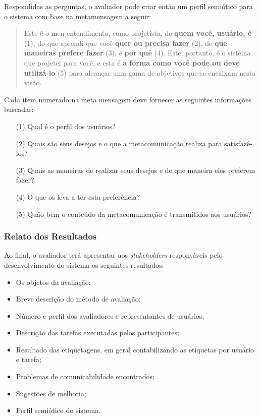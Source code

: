 \indent Respondidas as perguntas, o avaliador pode criar então um perfil semiótico para o sistema com base na metamensagem a seguir:

\begin{quote}
Este é o meu entendimento, como projetista, de \textbf{quem você, usuário, é} (1), do que aprendi que você \textbf{quer ou precisa fazer} (2), de \textbf{que maneiras prefere fazer} (3), e \textbf{por quê} (4). Este, portanto, é o sistema que projetei para você, e esta é \textbf{a forma como você pode ou deve utilizá-lo} (5) para alcançar uma gama de objetivos que se encaixam nesta visão.
\end{quote}

\indent Cada item numerado na meta mensagem deve fornecer as seguintes informações buscadas:

\begin{itemize}
\item[(1)] Qual é o perfil dos usuários?
\item[(2)] Quais são seus desejos e o que a metacomunicação realiza para satisfazê-los?
\item[(3)] Quais as maneiras de realizar seus desejos e de que maneira eles preferem fazer?
\item[(4)] O que os leva a ter esta preferência?
\item[(5)] Quão bem o conteúdo da metacomunicação é transmitidos aos usuários?
\end{itemize}


\subsubsection{Relato dos Resultados}

\indent Ao final, o avaliador terá apresentar aos \textit{stakeholders} responsáveis pelo desenvolvimento do sistema os seguintes resultados:

\begin{itemize}
\item Os objetos da avaliação;
\item Breve descrição do método de avaliação;
\item Número e perfil dos avaliadores e representantes de usuários;
\item Descrição das tarefas executadas pelos participantes;
\item Resultado das etiquetagens, em geral contabilizando as etiquetas por usuário e tarefa;
\item Problemas de comunicabilidade encontrados;
\item Sugestões de melhoria;
\item Perfil semiótico do sistema.
\end{itemize}





